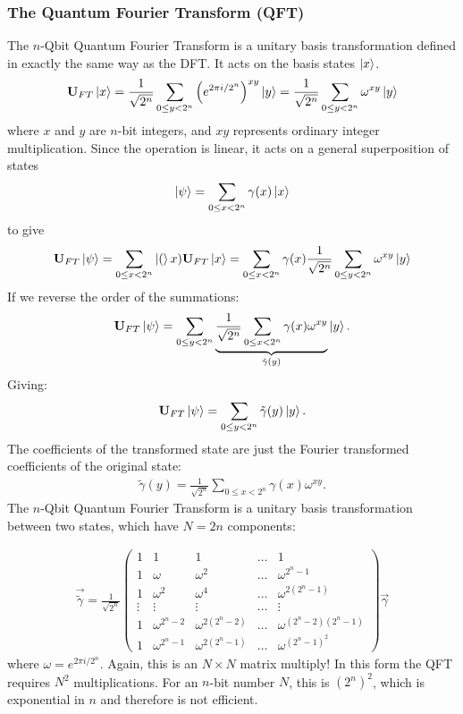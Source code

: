 \documentclass{book}
\theoremstyle{definition}
\newcommand{\f}[2]{\frac{#1}{#2}}
\newcommand{\lp}{\left(}
\newcommand{\rp}{\right)}
\newcommand{\U}{\mathbf{U}}
\begin{document}
\subsubsection{The Quantum Fourier Transform (QFT)}

The $n$-Qbit Quantum Fourier Transform is a unitary basis transformation defined in exactly the same way as the DFT. It acts on the basis states $\ket{x}$. 
\begin{align}
\U_{FT} \ket{x} = \f{1}{\sqrt{2^n}}\sum_{0 \leq y < 2^n}\lp e^{2\pi i /2^n}\rp^{xy}\ket{y} = \f{1}{\sqrt{2^n}}\sum_{0 \leq y < 2^n} \omega^{xy}\ket{y}
\end{align}
where $x$ and $y$ are $n$-bit integers, and $xy$ represents ordinary integer
multiplication. Since the operation is linear, it acts on a general
superposition of states 
\begin{align}
\ket{\psi} = \sum_{0 \leq x < 2^n} \gamma(x)\ket{x}
\end{align}
to give
\begin{align}
\U_{FT}\ket{\psi} = \sum_{0 \leq x < 2^n} \ket(x)\U_{FT}\ket{x} = \sum_{0 \leq x < 2^n} \gamma(x)\f{1}{\sqrt{2^n}} \sum_{0 \leq y < 2^n}\omega^{xy}\ket{y}
\end{align}
If we reverse the order of the summations:
\begin{align}
\U_{FT}\ket{\psi} = \sum_{0 \leq y < 2^n} \underbrace{\f{1}{\sqrt{2^n}}\sum_{0 \leq x < 2^n} \gamma(x)\omega^{xy}}_{\tilde{\gamma}(y)}\ket{y}. 
\end{align}
Giving:
\begin{align}
\U_{FT}\ket{\psi} =  \sum_{0 \leq y < 2^n}\tilde{\gamma}(y)\ket{y}.
\end{align}
The coefficients of the transformed state are just the Fourier transformed
coefficients of the original state:
\begin{align}
\tilde{\gamma}(y) = \f{1}{\sqrt{2^n}}\sum_{0 \leq x < 2^n}\gamma(x)\omega^{xy}.
\end{align}
The $n$-Qbit Quantum Fourier Transform is a unitary basis transformation
between two states, which have $N = 2n$ components:

\begin{align}
\vec{\tilde{\gamma}} = \f{1}{\sqrt{2^n}}\begin{pmatrix}
1 & 1 & 1 & \dots & 1\\
1 & \omega & \omega^2 &\dots & \omega^{2^n-1}\\
1 & \omega^2 & \omega^4 &\dots & \omega^{2(2^n-1)}\\
\vdots & \vdots & \vdots & \dots  & \vdots\\
1 & \omega^{2^n-2} & \omega^{2(2^n-2)} & \dots & \omega^{(2^n-2)(2^n-1)}\\
1 & \omega^{2^n-1}& \omega^{2(2^n-1)} & \dots & \omega^{(2^n-1)^2}
\end{pmatrix}\vec{\gamma}
\end{align}
where $\omega = e^{2\pi i /2^n}$. Again, this is an $N \times N$ matrix multiply! In this form the QFT requires $N^2$
multiplications. For an $n$-bit number $N$, this is $(2^n)^2$, which is exponential in $n$
and therefore is not efficient. 
\end{document}
